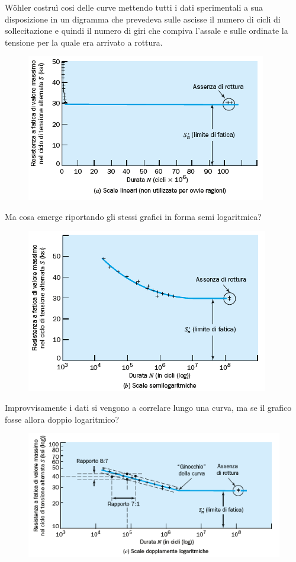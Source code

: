 		Wöhler costruì cosi delle curve mettendo tutti i dati sperimentali a sua disposizione in un digramma che prevedeva sulle ascisse il numero di cicli di sollecitazione e quindi il numero di giri che compiva l'assale e sulle ordinate la tensione per la quale era arrivato a rottura. 
		
		\begin{figure}[H]
			\centering
			\includegraphics[width=0.5\linewidth]{immagini_10/screenshot001}
			\label{fig:screenshot001}
		\end{figure}
		
		Ma cosa emerge riportando gli stessi grafici in forma semi logaritmica? 
		
		\begin{figure}[H]
			\centering
			\includegraphics[width=0.5\linewidth]{immagini_10/screenshot002}
			\label{fig:screenshot002}
		\end{figure}		
		
		Improvvisamente i dati si vengono a correlare lungo una curva, ma se il grafico fosse allora doppio logaritmico?
		
		\begin{figure}[H]
			\centering
			\includegraphics[width=0.5\linewidth]{immagini_10/screenshot003}
			\label{fig:screenshot003}
		\end{figure}		 
		
